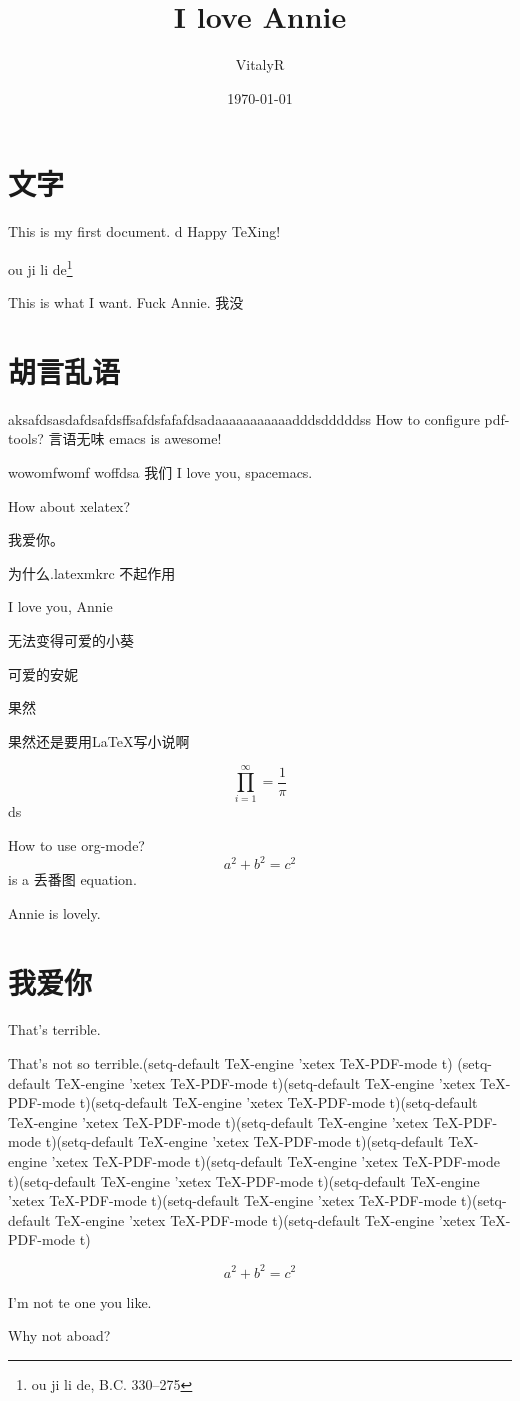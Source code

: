 \documentclass[UTF8]{ctexart}
\title{I love Annie}
\author{VitalyR}
\date{\today}
\begin{document}
\maketitle
\tableofcontents

\section{文字}
This is my first document.
d
Happy \TeX ing!

ou ji li de\footnote{ou ji li de, B.C. 330--275}

This is what I want.
Fuck Annie.
我没 

\section{胡言乱语}

aksafdsasdafdsafdsffsafdsfafafdsadaaaaaaaaaaadddsdddddss
How to configure pdf-tools?
言语无味
emacs is awesome!

wowomfwomf woffdsa
我们
I love you, spacemacs.


How about xelatex?

我爱你。

为什么.latexmkrc 不起作用

I love you, Annie

无法变得可爱的小葵

可爱的安妮

果然

果然还是要用\LaTeX 写小说啊


\begin{equation}
  \prod_{i=1}^{\infty}=\frac{1}{\pi}
  \end{equation}
  ds

How to use org-mode?
\[a^{2}+b^{2}=c^{2}\] is a 丢番图 equation.


Annie is lovely.




\section{我爱你}
That's terrible.

That's not so terrible.(setq-default TeX-engine 'xetex
              TeX-PDF-mode t)
(setq-default TeX-engine 'xetex
              TeX-PDF-mode t)(setq-default TeX-engine 'xetex
              TeX-PDF-mode t)(setq-default TeX-engine 'xetex
              TeX-PDF-mode t)(setq-default TeX-engine 'xetex
              TeX-PDF-mode t)(setq-default TeX-engine 'xetex
              TeX-PDF-mode t)(setq-default TeX-engine 'xetex
              TeX-PDF-mode t)(setq-default TeX-engine 'xetex
              TeX-PDF-mode t)(setq-default TeX-engine 'xetex
              TeX-PDF-mode t)(setq-default TeX-engine 'xetex
              TeX-PDF-mode t)(setq-default TeX-engine 'xetex
              TeX-PDF-mode t)(setq-default TeX-engine 'xetex
              TeX-PDF-mode t)(setq-default TeX-engine 'xetex
              TeX-PDF-mode t)(setq-default TeX-engine 'xetex
              TeX-PDF-mode t)

\begin{equation}
\label{eq:2}
a^{2}+b^{2}=c^{2}
\end{equation}


I'm not te one you like.

Why not aboad?
\end{document}
